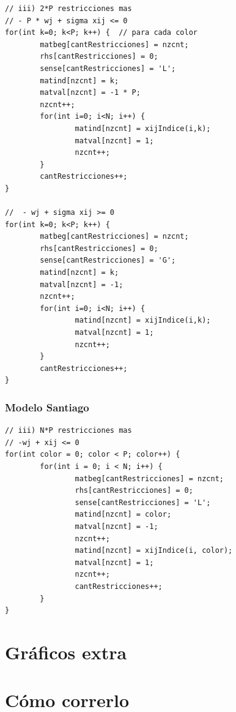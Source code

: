 \documentclass[a4paper, 10pt, twoside]{article}
\begin{document}
\begin{lstlisting}
// iii) 2*P restricciones mas
// - P * wj + sigma xij <= 0
for(int k=0; k<P; k++) {  // para cada color
		matbeg[cantRestricciones] = nzcnt;
		rhs[cantRestricciones] = 0;
		sense[cantRestricciones] = 'L';
		matind[nzcnt] = k;
		matval[nzcnt] = -1 * P;
		nzcnt++;
		for(int i=0; i<N; i++) {
				matind[nzcnt] = xijIndice(i,k);
				matval[nzcnt] = 1;
				nzcnt++;
		}
		cantRestricciones++;
}

//  - wj + sigma xij >= 0
for(int k=0; k<P; k++) {
		matbeg[cantRestricciones] = nzcnt;
		rhs[cantRestricciones] = 0;
		sense[cantRestricciones] = 'G';
		matind[nzcnt] = k;
		matval[nzcnt] = -1;
		nzcnt++;
		for(int i=0; i<N; i++) {
				matind[nzcnt] = xijIndice(i,k);
				matval[nzcnt] = 1;
				nzcnt++;
		}
		cantRestricciones++;
}
\end{lstlisting}

\subsubsection{Modelo Santiago}
\label{codigo-modelo-santiago}

\begin{lstlisting}
// iii) N*P restricciones mas
// -wj + xij <= 0
for(int color = 0; color < P; color++) { 
		for(int i = 0; i < N; i++) {
				matbeg[cantRestricciones] = nzcnt;
				rhs[cantRestricciones] = 0;
				sense[cantRestricciones] = 'L';
				matind[nzcnt] = color;
				matval[nzcnt] = -1;
				nzcnt++;
				matind[nzcnt] = xijIndice(i, color);
				matval[nzcnt] = 1;
				nzcnt++;
				cantRestricciones++;
		}
}
\end{lstlisting}


\newpage

\section{Gráficos extra}
\label{apendice-graficos}


\newpage

\section{Cómo correrlo}
\label{como-correrlo}
\end{document}
